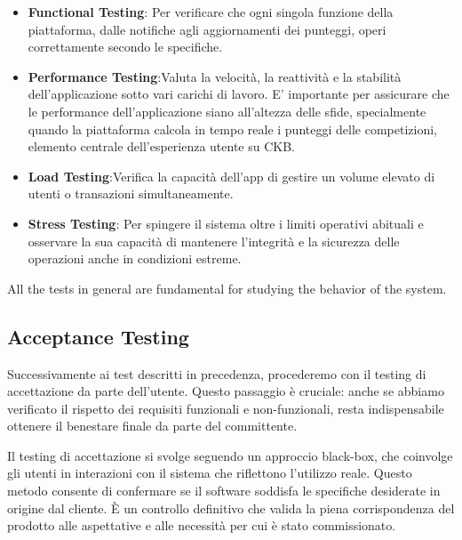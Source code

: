 \begin{itemize}

 \item \textbf{Functional Testing}: Per verificare  che ogni singola funzione della piattaforma, dalle notifiche agli aggiornamenti dei punteggi, operi correttamente secondo le specifiche. 

  
  \item \textbf{Performance Testing}:Valuta la velocità, la reattività e la stabilità dell'applicazione sotto vari carichi di lavoro. E' importante per assicurare che le performance dell'applicazione siano all'altezza delle sfide, specialmente quando la piattaforma calcola in tempo reale i punteggi delle competizioni, elemento centrale dell'esperienza utente su CKB.
  
  \item \textbf{Load Testing}:Verifica la capacità dell'app di gestire un volume elevato di utenti o transazioni simultaneamente.
  
  \item \textbf{Stress Testing}: Per spingere il sistema oltre i limiti operativi abituali e osservare la sua capacità di mantenere l'integrità e la sicurezza delle operazioni anche in condizioni estreme.
  
\end{itemize}
All the tests in general are fundamental for studying the behavior of the system.



\subsection{Acceptance Testing}

Successivamente ai test descritti in precedenza, procederemo con il testing di accettazione da parte dell'utente. Questo passaggio è cruciale: anche se abbiamo verificato il rispetto dei requisiti funzionali e non-funzionali, resta indispensabile ottenere il benestare finale da parte del committente.

Il testing di accettazione si svolge seguendo un approccio black-box, che coinvolge gli utenti in interazioni con il sistema che riflettono l'utilizzo reale. Questo metodo consente di confermare se il software soddisfa le specifiche desiderate in origine dal cliente. È un controllo definitivo che valida la piena corrispondenza del prodotto alle aspettative e alle necessità per cui è stato commissionato.





